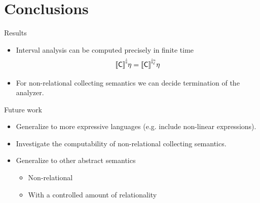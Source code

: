 \documentclass[presentation]{beamer}
\begin{document}
\section{Conclusions}
\label{sec:orgddde969}
\begin{frame}[label={sec:org4be2c18}]{Results}
\begin{itemize}
\item Interval analysis can be computed precisely in finite time
\begin{equation*}
  \semi[\inte]{\com}\eta = \semi[\binte{\low}{\upp}]{\com}\eta
\end{equation*}
\item For non-relational collecting semantics we can decide termination
of the analyzer.
\end{itemize}
\end{frame}
\begin{frame}[label={sec:orgbab2632}]{Future work}
\begin{itemize}
\item Generalize to more expressive languages (e.g. include non-linear
expressions).
\item Investigate the computability of non-relational collecting
semantics.
\item Generalize to other abstract semantics
\begin{itemize}
\item Non-relational
\item With a controlled amount of relationality
\end{itemize}
\end{itemize}
\end{frame}
\end{document}
